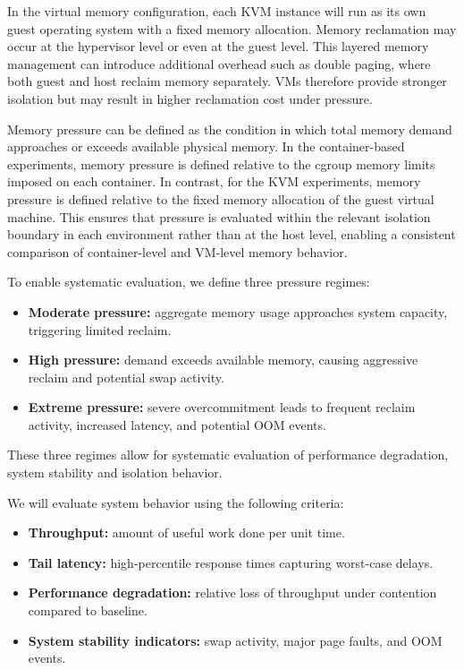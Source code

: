 \documentclass[conference]{IEEEtran}
\begin{document}
In the virtual memory configuration, each KVM instance will run as its own guest operating system with a fixed memory allocation. Memory reclamation may occur at the hypervisor level or even at the guest level. This layered memory management can introduce additional overhead such as double paging, where both guest and host reclaim memory separately. VMs therefore provide stronger isolation but may result in higher reclamation cost under pressure.

Memory pressure can be defined as the condition in which total memory demand approaches or exceeds available physical memory. In the container-based experiments, memory pressure is defined relative to the cgroup memory limits imposed on each container. In contrast, for the KVM experiments, memory pressure is defined relative to the fixed memory allocation of the guest virtual machine. This ensures that pressure is evaluated within the relevant isolation boundary in each environment rather than at the host level, enabling a consistent comparison of container-level and VM-level memory behavior.

To enable systematic evaluation, we define three pressure regimes:

\begin{itemize}
\item \textbf{Moderate pressure:} aggregate memory usage approaches system capacity, triggering limited reclaim.
\item \textbf{High pressure:} demand exceeds available memory, causing aggressive reclaim and potential swap activity.
\item \textbf{Extreme pressure:} severe overcommitment leads to frequent reclaim activity, increased latency, and potential OOM events.
\end{itemize}
These three regimes allow for systematic evaluation of performance degradation, system stability and isolation behavior.

We will evaluate system behavior using the following criteria:

\begin{itemize}
\item \textbf{Throughput:} amount of useful work done per unit time.
\item \textbf{Tail latency:} high-percentile response times capturing worst-case delays.
\item \textbf{Performance degradation:} relative loss of throughput under contention compared to baseline.
\item \textbf{System stability indicators:} swap activity, major page faults, and OOM events.
\end{itemize}
\end{document}
